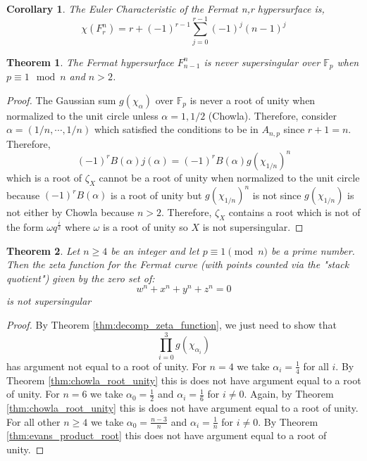 \documentclass{article}
\newcommand{\F}{\mathbb{F}}
\newtheorem{theorem}{Theorem}[section]
\newtheorem{corollary}{Corollary}[theorem]
\theoremstyle{definition}
\theoremstyle{definition}
\theoremstyle{remark}
\begin{document}
\begin{corollary}
The Euler Characteristic of the Fermat n,r hypersurface is,
\[ \chi(F^n_r) = r + (-1)^{r-1} \sum\limits_{j=0}^{r-1} (-1)^j (n-1)^j \] 
\end{corollary}

\begin{theorem}
The Fermat hypersurface $F^n_{n-1}$ is never supersingular over $\F_p$ when $p \equiv 1 \mod n$ and $n > 2$.
\end{theorem}

\begin{proof}
The Gaussian sum $g(\chi_\alpha)$ over $\F_p$ is never a root of unity when normalized to the unit circle unless $\alpha = 1, 1/2$ (Chowla). Therefore, consider $\alpha = (1/n, \cdots, 1/n)$ which satisfied the conditions to be in $A_{n,p}$ since $r + 1 = n$. Therefore, 
\[ (-1)^r B(\alpha) j(\alpha) = (-1)^r B(\alpha) g(\chi_{1/n})^{n} \]
which is a root of $\zeta_X$ 
cannot be a root of unity when normalized to the unit circle because $(-1)^r B(\alpha)$ is a root of unity but $g(\chi_{1/n})^{n}$ is not since $g(\chi_{1/n})$ is not either by Chowla because $n > 2$. Therefore, $\zeta_X$ contains a root which is not of the form $\omega q^{\frac{i}{2}}$ where $\omega$ is a root of unity so $X$ is not supersingular. 
\end{proof}


\begin{theorem}
Let $n \ge 4$ be an integer and let $p \equiv 1 \pmod{n}$ be a prime number. Then the zeta function for the Fermat curve (with points counted via the "stack quotient") given by the zero set of:
\[w^n + x^n + y^n + z^n = 0\]
is not supersingular
\end{theorem}
\begin{proof}
By Theorem \ref{thm:decomp_zeta_function}, we just need to show that 
\[\prod_{i=0}^3 g(\chi_{\alpha_i})\]
has argument not equal to a root of unity. For $n = 4$ we take $\alpha_i = \frac{1}{4}$ for all $i$. By Theorem \ref{thm:chowla_root_unity} this is does not have argument equal to a root of unity. For $n = 6$ we take $\alpha_0 = \frac{1}{2}$ and $\alpha_i = \frac{1}{6}$ for $i \neq 0$. Again, by Theorem \ref{thm:chowla_root_unity} this is does not have argument equal to a root of unity. For all other $n \ge 4$ we take $\alpha_0 = \frac{n - 3}{n}$ and $\alpha_i = \frac{1}{n}$ for $i \neq 0$. By Theorem \ref{thm:evans_product_root} this does not have argument equal to a root of unity. 
\end{proof}
\end{document}
